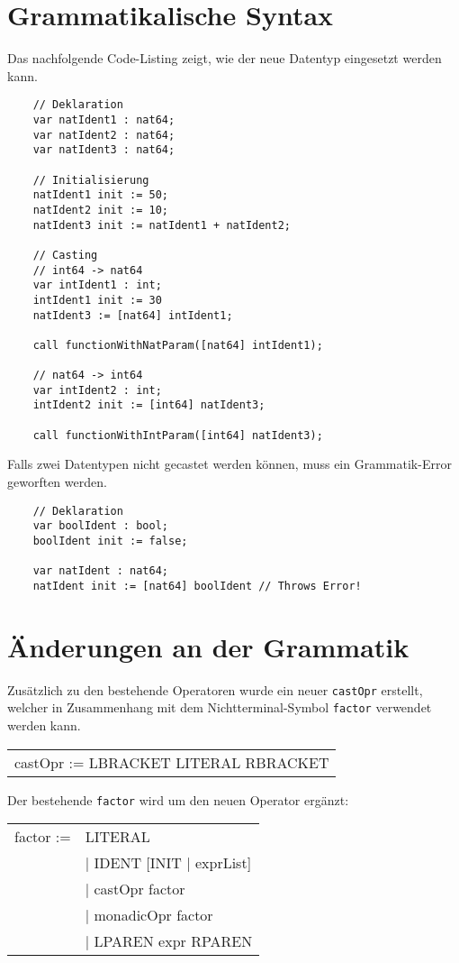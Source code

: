 \documentclass[10pt, a4paper, twocolumn]{article} %
\begin{document}
\section{Grammatikalische Syntax}
Das nachfolgende Code-Listing zeigt, wie der neue Datentyp eingesetzt werden kann.
\begin{lstlisting}
    // Deklaration
    var natIdent1 : nat64;
    var natIdent2 : nat64;
    var natIdent3 : nat64;

    // Initialisierung
    natIdent1 init := 50;
    natIdent2 init := 10;
    natIdent3 init := natIdent1 + natIdent2;

    // Casting
    // int64 -> nat64
    var intIdent1 : int;
    intIdent1 init := 30
    natIdent3 := [nat64] intIdent1;

    call functionWithNatParam([nat64] intIdent1);

    // nat64 -> int64
    var intIdent2 : int;
    intIdent2 init := [int64] natIdent3;

    call functionWithIntParam([int64] natIdent3);
\end{lstlisting}

Falls zwei Datentypen nicht gecastet werden können, muss ein Grammatik-Error geworften werden.
\begin{lstlisting}
    // Deklaration
    var boolIdent : bool;
    boolIdent init := false;

    var natIdent : nat64;
    natIdent init := [nat64] boolIdent // Throws Error!
\end{lstlisting}

\section{Änderungen an der Grammatik}

Zusätzlich zu den bestehende Operatoren wurde ein neuer \texttt{castOpr} erstellt, welcher in Zusammenhang mit dem Nichtterminal-Symbol \texttt{factor} verwendet werden kann.

\begin{table}[h]
    \centering
    \small
    \begin{tabular}{l}
        castOpr := LBRACKET LITERAL RBRACKET
    \end{tabular}
\end{table}

Der bestehende \texttt{factor} wird um den neuen Operator ergänzt:

\begin{table}[h]
    \centering
    \small
    \begin{tabular}{ll}
        factor :=   & LITERAL \\
                    & | IDENT [INIT | exprList] \\
                    & | castOpr factor \\
                    & | monadicOpr factor \\
                    & | LPAREN expr RPAREN
    \end{tabular}
\end{table}
\end{document}

